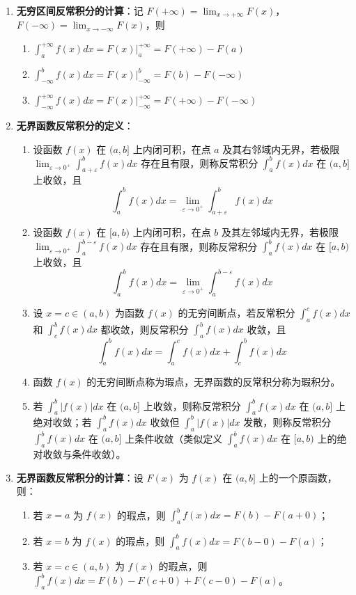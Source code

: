 \documentclass[UTF8]{ctexart}
\theoremstyle{remark}
\begin{document}
\begin{enumerate}
	\item \textbf{无穷区间反常积分的计算}：记 \(F(+\infty) = \lim_{x \to +\infty} F(x)\)，\(F(-\infty) = \lim_{x \to -\infty} F(x)\)，则
	\begin{enumerate}
		\item \(\int_{a}^{+\infty} f(x) dx = \left. F(x) \right|_{a}^{+\infty} = F(+\infty) - F(a)\)
		\item \(\int_{-\infty}^{b} f(x) dx = \left. F(x) \right|_{-\infty}^{b} = F(b) - F(-\infty)\)
		\item \(\int_{-\infty}^{+\infty} f(x) dx = \left. F(x) \right|_{-\infty}^{+\infty} = F(+\infty) - F(-\infty)\)
	\end{enumerate}

	\item \textbf{无界函数反常积分的定义}：
	\begin{enumerate}
		\item 设函数 \(f(x)\) 在 \((a, b]\) 上内闭可积，在点 \(a\) 及其右邻域内无界，若极限 \(\lim_{\varepsilon \to 0^{+}} \int_{a+\varepsilon}^{b} f(x) dx\) 存在且有限，则称反常积分 \(\int_{a}^{b} f(x) dx\) 在 \((a, b]\) 上收敛，且
		\[
		\int_{a}^{b} f(x) dx = \lim_{\varepsilon \to 0^{+}} \int_{a+\varepsilon}^{b} f(x) dx
		\]
		\item 设函数 \(f(x)\) 在 \([a, b)\) 上内闭可积，在点 \(b\) 及其左邻域内无界，若极限 \(\lim_{\varepsilon \to 0^{+}} \int_{a}^{b-\varepsilon} f(x) dx\) 存在且有限，则称反常积分 \(\int_{a}^{b} f(x) dx\) 在 \([a, b)\) 上收敛，且
		\[
		\int_{a}^{b} f(x) dx = \lim_{\varepsilon \to 0^{+}} \int_{a}^{b-\varepsilon} f(x) dx
		\]
		\item 设 \(x = c \in (a, b)\) 为函数 \(f(x)\) 的无穷间断点，若反常积分 \(\int_{a}^{c} f(x) dx\) 和 \(\int_{c}^{b} f(x) dx\) 都收敛，则反常积分 \(\int_{a}^{b} f(x) dx\) 收敛，且
		\[
		\int_{a}^{b} f(x) dx = \int_{a}^{c} f(x) dx + \int_{c}^{b} f(x) dx
		\]
		\item 函数 \(f(x)\) 的无穷间断点称为瑕点，无界函数的反常积分称为瑕积分。
		\item 若 \(\int_{a}^{b} |f(x)| dx\) 在 \((a, b]\) 上收敛，则称反常积分 \(\int_{a}^{b} f(x) dx\) 在 \((a, b]\) 上绝对收敛；若 \(\int_{a}^{b} f(x) dx\) 收敛但 \(\int_{a}^{b} |f(x)| dx\) 发散，则称反常积分 \(\int_{a}^{b} f(x) dx\) 在 \((a, b]\) 上条件收敛（类似定义 \(\int_{a}^{b} f(x) dx\) 在 \([a, b)\) 上的绝对收敛与条件收敛）。
	\end{enumerate}
	
	\item \textbf{无界函数反常积分的计算}：设 \(F(x)\) 为 \(f(x)\) 在 \((a, b]\) 上的一个原函数，则：
	\begin{enumerate}
		\item 若 \(x = a\) 为 \(f(x)\) 的瑕点，则 \(\int_{a}^{b} f(x) dx = F(b) - F(a+0)\)；
		\item 若 \(x = b\) 为 \(f(x)\) 的瑕点，则 \(\int_{a}^{b} f(x) dx = F(b-0) - F(a)\)；
		\item 若 \(x = c \in (a, b)\) 为 \(f(x)\) 的瑕点，则 \(\int_{a}^{b} f(x) dx = F(b) - F(c+0) + F(c-0) - F(a)\)。
	\end{enumerate}
	

\end{enumerate}
\end{document}
